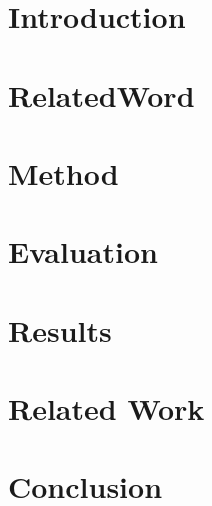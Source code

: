 \documentclass[letterpaper]{tandon_thesis}
\begin{document}
\section{Introduction}\label{sec:ChapThreeIntroduction}


\section{RelatedWord}\label{sec:ChapThreeMotivation}


\section{Method}\label{sec:ChapThreeMethod}


\section{Evaluation}\label{sec:ChapThreeEvaluation}


\section{Results}\label{sec:ChapThreeResults}


\section{Related Work}\label{sec:ChapThreeDiscussion} 


\section{Conclusion}\label{sec:ChapThreeConclusion}




{\singlespace
\printbibliography}
\end{document}
